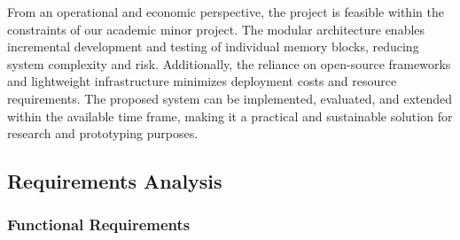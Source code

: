 ﻿\documentclass[12pt,a4paper]{article}
\begin{document}
From an operational and economic perspective, the project is feasible within the constraints of our academic minor project. The modular architecture enables incremental development and testing of individual memory blocks, reducing system complexity and risk. Additionally, the reliance on open-source frameworks and lightweight infrastructure minimizes deployment costs and resource requirements. The proposed system can be implemented, evaluated, and extended within the available time frame, making it a practical and sustainable solution for research and prototyping purposes.


\subsection{Requirements Analysis}

\subsubsection{Functional Requirements}
\end{document}
